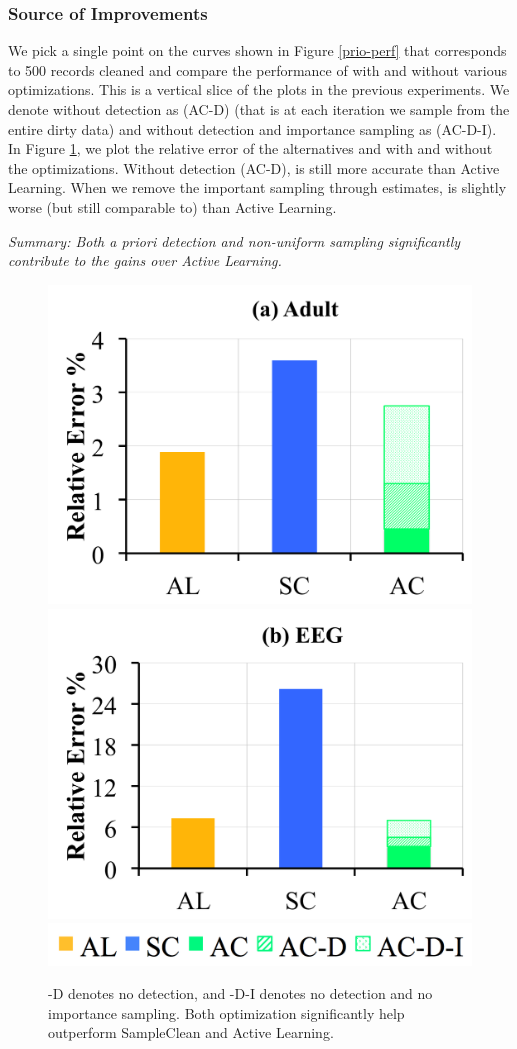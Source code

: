 \subsubsection{Source of Improvements}
We pick a single point on the curves shown in Figure \ref{prio-perf} that corresponds to 500 records cleaned and compare the performance of \sys with and without various optimizations.
This is a vertical slice of the plots in the previous experiments.
We denote \sys without detection as (AC-D) (that is at each iteration we sample from the entire dirty data) and \sys without detection and importance sampling as (AC-D-I).
In Figure \ref{opts}, we plot the relative error of the alternatives and \sys with and without the optimizations.
Without detection (AC-D), \sys is still more accurate than Active Learning.
When we remove the important sampling through estimates, \sys is slightly worse (but still comparable to) than Active Learning.

\vspace{0.25em}

\noindent \emph{Summary: Both a priori detection and non-uniform sampling significantly contribute to the gains over Active Learning.}

\begin{figure}[ht!]
\centering
 \includegraphics[width=0.49\columnwidth]{exp/exp8a.png}
 \includegraphics[width=0.49\columnwidth]{exp/exp8b.png}
 \includegraphics[width=0.5\columnwidth]{exp/legend-8.png}\vspace{-1em}
 \caption{ -D denotes no detection, and -D-I denotes no detection and no importance sampling. Both optimization significantly help \sys outperform SampleClean and Active Learning. \label{opts}}\vspace{-1.5em}
\end{figure}

